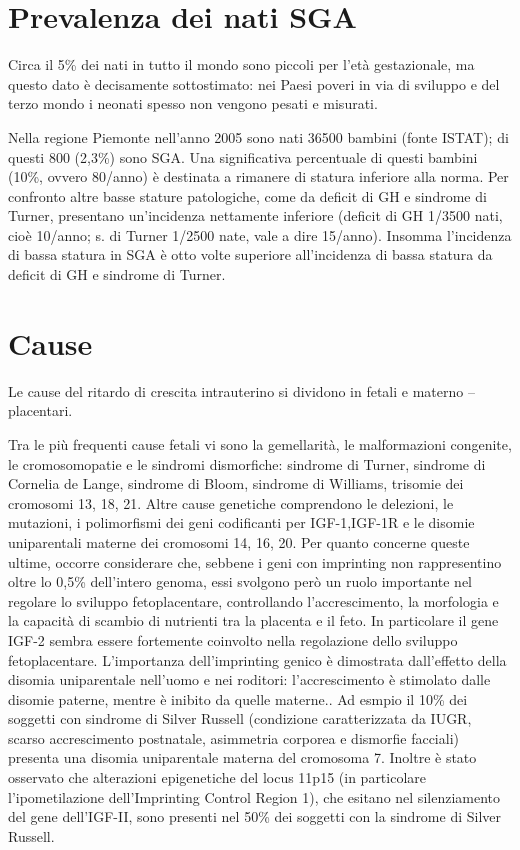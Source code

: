 \section{Prevalenza dei nati SGA}

Circa il 5\% dei nati in tutto il mondo sono piccoli per l'età gestazionale, 
ma questo dato è decisamente sottostimato: nei Paesi poveri in via di sviluppo 
e del terzo mondo i neonati spesso non vengono pesati e misurati\cite{novonordisk}.

Nella regione Piemonte nell'anno 2005 sono nati 36500 bambini (fonte ISTAT); di questi 800 (2,3\%) sono SGA. Una significativa percentuale di questi bambini (10\%, ovvero 80/anno) è destinata a rimanere di statura inferiore alla norma. Per confronto altre basse stature patologiche, come da deficit di GH e sindrome di Turner, presentano un'incidenza nettamente inferiore (deficit di GH 1/3500 nati, cioè 10/anno; s. di Turner 1/2500 nate, vale a dire 15/anno). Insomma l'incidenza di bassa statura in SGA è otto volte superiore all'incidenza di bassa statura da deficit di GH e sindrome di Turner. 


\section{Cause}

Le cause del ritardo di crescita intrauterino si dividono in
fetali e materno -- placentari.


Tra le più frequenti cause fetali vi sono la gemellarità, le malformazioni congenite, le cromosomopatie e le sindromi dismorfiche: sindrome di Turner, sindrome di Cornelia de Lange, sindrome di Bloom, sindrome di Williams, trisomie dei cromosomi 13, 18, 21.
Altre cause genetiche comprendono le delezioni, le mutazioni, i polimorfismi dei geni codificanti per IGF-1,IGF-1R \cite{woods1996intrauterine} \cite{vaessen2002association} \cite{arends2002polymorphism}
e le disomie uniparentali materne dei cromosomi 14, 16, 20\cite{fowden2006imprinted}. 
Per quanto concerne queste ultime, occorre considerare che, sebbene
i geni con imprinting non rappresentino oltre lo 0,5\% dell'intero genoma, essi svolgono
però un ruolo importante nel regolare lo sviluppo fetoplacentare, controllando l'accrescimento, la 
morfologia e la capacità di scambio di nutrienti tra la placenta e il feto.
In particolare il gene IGF-2 sembra essere fortemente coinvolto nella regolazione dello sviluppo
fetoplacentare. L'importanza dell'imprinting genico è dimostrata dall'effetto della disomia uniparentale
nell'uomo e nei roditori: l'accrescimento è stimolato dalle disomie paterne, mentre \`e inibito da quelle materne.\cite{fowden2006imprinted}.
Ad esmpio il 10\% dei soggetti con sindrome di Silver Russell (condizione caratterizzata da IUGR, scarso accrescimento postnatale, asimmetria corporea e dismorfie facciali) presenta una disomia uniparentale materna del cromosoma 7. Inoltre è stato osservato che alterazioni epigenetiche del locus 11p15 (in particolare l'ipometilazione dell'Imprinting Control Region 1), che esitano nel silenziamento del gene dell'IGF-II, sono presenti nel 50\% dei soggetti con la sindrome di Silver Russell\cite{gicquel2005epimutation}.


